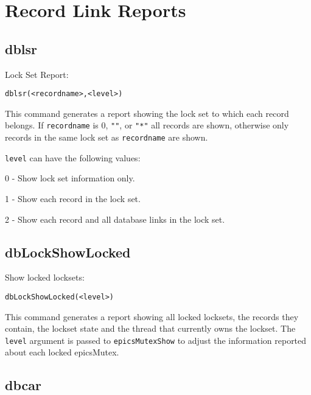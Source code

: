 \section{Record Link Reports}

\subsection{dblsr}

Lock Set Report:

\begin{verbatim}
dblsr(<recordname>,<level>)
\end{verbatim}

This command generates a report showing the lock set to which each record belongs. If \verb|recordname| is 0, \verb|""|, or \verb|"*"| all 
records are shown, otherwise only records in the same lock set as \verb|recordname| are shown.

\verb|level| can have the following values:

\begin{description}
\item 0 - Show lock set information only.

\item 1 - Show each record in the lock set.

\item 2 - Show each record and all database links in the lock set.

\end{description}

\subsection{dbLockShowLocked}

Show locked locksets:

\begin{verbatim}
dbLockShowLocked(<level>)
\end{verbatim}

This command generates a report showing all locked locksets, the records they contain, the lockset state and the thread 
that currently owns the lockset. The \verb|level| argument is passed to \verb|epicsMutexShow| to adjust the information reported 
about each locked epicsMutex.

\subsection{dbcar}

